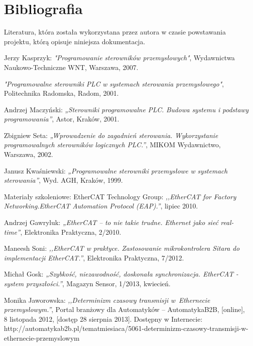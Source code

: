 \section{Bibliografia}
Literatura, która została wykorzystana przez autora w czasie powstawania projektu, którą opisuje niniejsza dokumentacja.

\begin{thebibliography}{99}
Jerzy Kasprzyk: 
\emph{"Programowanie sterowników przemysłowych"},
Wydawnictwa Naukowo-Techniczne WNT, 
Warszawa, 
2007.      

\emph{"Programowalne sterowniki PLC w systemach sterowania przemysłowego"}, 
Politechnika Radomska, 
Radom,
2001.

Andrzej Maczyński:
\emph{„Sterowniki programowalne PLC. Budowa systemu i podstawy programowania”},
Astor, 
Kraków,
2001. 

Zbigniew Seta: 
\emph{„Wprowadzenie do zagadnień sterowania. Wykorzystanie programowalnych sterowników logicznych PLC.”},
MIKOM Wydawnictwo, 
Warszawa,
2002. 

Janusz Kwaśniewski: 
\emph{„Programowalne sterowniki przemysłowe w systemach sterowania”}, 
Wyd. AGH, 
Kraków,
1999.

%
Materiały szkoleniowe: EtherCAT Technology Group:
\emph{,,EtherCAT for Factory Networking.EtherCAT Automation Protocol (EAP).''},
lipiec 2010.

%

Andrzej Gawryluk:
\emph{„EtherCAT – to nie takie trudne. Ethernet jako sieć real-time”},
Elektronika Praktyczna, 2/2010.

Maneesh Soni:
\emph{,,EtherCAT w praktyce. Zastosowanie mikrokontrolera Sitara do implementacji EtherCAT.''},
Elektronika Praktyczna, 7/2012.

Michał Gosk:
\emph{„Szybkość, niezawodność, doskonała synchronizacja. EtherCAT - system przyszłości.”},
Magazyn Sensor, 1/2013, kwiecień.

Monika Jaworowska:
\emph{,,Determinizm czasowy transmisji w~Ethernecie przemysłowym.''},
Portal branżowy dla Automatyków -- AutomatykaB2B, 
[online],
8 listopada 2012,
[dostęp 28 sierpnia 2013].
Dostępny w Internecie: \\
http://automatykab2b.pl/tematmiesiaca/5061-determinizm-czasowy-transmisji-w-ethernecie-przemyslowym


\end{thebibliography}
